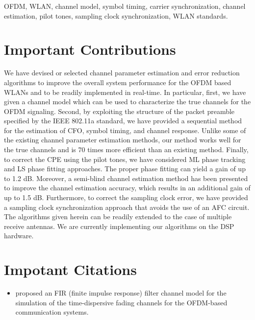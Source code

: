\documentclass[11pt,draftnofoot,onecolumn]{IEEEtran}
\begin{document}
OFDM, WLAN, channel model, 
symbol timing, carrier synchronization,
channel estimation, pilot tones, 
sampling clock synchronization, WLAN standards.


\section*{Important Contributions}

We have devised or selected channel parameter estimation and error 
reduction algorithms to improve the overall system performance
for the OFDM based WLANs and to be readily implemented in real-time. 
In particular, first, we have given a channel model which can be used to
characterize the true channels for the OFDM signaling.
Second, by exploiting the structure of the packet
preamble specified by the IEEE 802.11a standard, 
we have provided a sequential method for the estimation 
of CFO, symbol timing, and channel response.
Unlike some of the existing channel parameter estimation methods, 
our method works well for the true channels and is 70 times more 
efficient than an existing method.
Finally, to correct the CPE
using the pilot tones, we have considered ML phase tracking and 
LS phase fitting approaches. The proper phase fitting
can yield a gain of up to 1.2 dB. 
Moreover, a semi-blind
channel estimation method has been presented to improve
the channel estimation accuracy, which results in an additional
gain of up to 1.5 dB. 
Furthermore, to correct the sampling clock error, we have provided a 
sampling clock synchronization approach that avoids the use
of an AFC circuit. The algorithms given herein
can be readily extended to the case of multiple receive antennas.
We are currently implementing our algorithms
on the DSP hardware.


\section*{Impotant Citations}

\begin{itemize}

\item \cite{Chayat1997} proposed an FIR (finite impulse response)
filter channel model for the simulation of the time-dispersive fading channels for the
OFDM-based communication systems.


\end{itemize}




\end{document}
